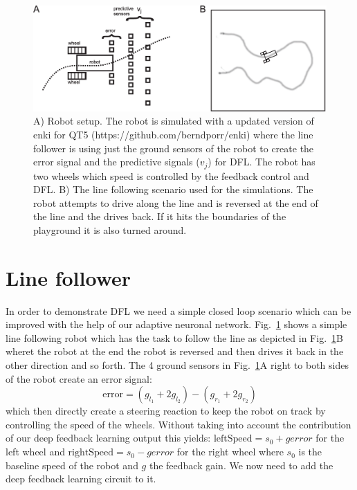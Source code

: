 \documentclass{llncs}
\begin{document}
\begin{figure}[h!]
  \centering
  \includegraphics[width=\columnwidth]{linefollower_robot_playground}
  \caption{A) Robot setup. The robot is simulated with a updated
    version of enki for QT5 (https://github.com/berndporr/enki)
    where the line follower is using just the ground sensors of the
    robot to create the error signal and the predictive signals ($v_j$)
    for DFL. The robot has two wheels which speed is controlled
    by the feedback control and DFL.
    B) The line following scenario used for the simulations. The robot
    attempts to drive along the line and is reversed at the end of the
    line and the drives back. If it hits the boundaries of the playground
    it is also turned around.
    \label{linefollower_robot_playground}}
\end{figure}




\section{Line follower}
In order to demonstrate DFL we need a simple closed loop scenario which can be
improved with the help of our adaptive neuronal network. 
Fig.~\ref{linefollower_robot_playground} shows a simple line following robot which has the task to
follow the line as depicted in
Fig.~\ref{linefollower_robot_playground}B wheret the robot at the end the robot is reversed
and then drives it back in the other direction and so forth. The 4 ground sensors
in Fig.~\ref{linefollower_robot_playground}A right to both sides of the robot create
an error signal:
\begin{equation}
\mathrm{error} = (g_{l_1}+2 g_{l_2})-(g_{r_1}+2 g_{r_2}) \label{line_error}
\end{equation}
which then directly create a steering reaction to keep the robot on track by
controlling the speed of the wheels. Without taking into account the contribution
of our deep feedback learning output this yields: $\mathrm{leftSpeed} = s_0 + g error$ for the
left wheel and $\mathrm{rightSpeed} = s_0 - g error$ for the right wheel
where $s_0$ is the baseline speed of the robot and $g$ the feedback gain. We now
need to add the deep feedback learning circuit to it.
\end{document}
